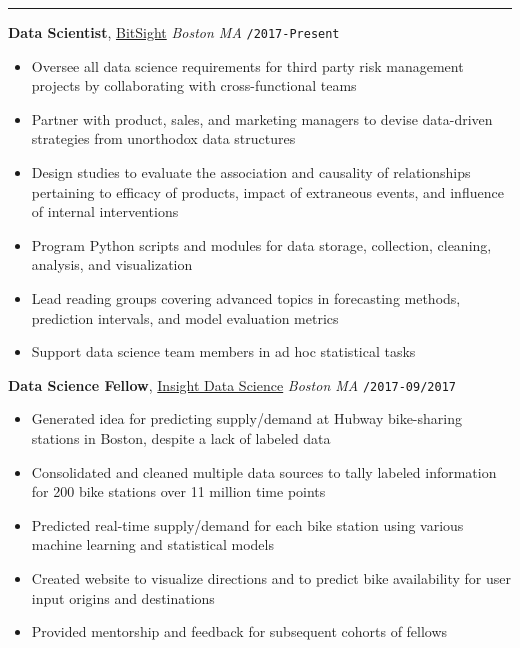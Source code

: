 \documentclass[10pt,english]{report}
\begin{document}
{}
\vspace{1mm}\hrule
\vspace{1mm}

\textbf{Data Scientist}, \textcolor{blue}{\href{https://www.bitsight.com}{BitSight}} \hfill \textit{Boston MA} \texttt{/2017-Present}
\vspace{1mm}
\begin{itemize}
\item Oversee all data science requirements for third party risk management projects by collaborating with cross-functional teams
\item Partner with product, sales, and marketing managers to devise data-driven strategies from unorthodox data structures
\item Design studies to evaluate the association and causality of relationships pertaining to efficacy of products, impact of extraneous events, and influence of internal interventions
\item Program Python scripts and modules for data storage, collection, cleaning, analysis, and visualization
\item Lead reading groups covering advanced topics in forecasting methods, prediction intervals, and model evaluation metrics
\item Support data science team members in ad hoc statistical tasks
\end{itemize}

\vspace{1mm}

\textbf{Data Science Fellow}, \textcolor{blue}{\href{https://www.insightdatascience.com}{Insight Data Science}} \hfill \textit{Boston MA} \texttt{/2017-09/2017}
\begin{itemize}
\item Generated idea for predicting supply/demand at Hubway bike-sharing stations in Boston, despite a lack of labeled data
\item Consolidated and cleaned multiple data sources to tally labeled information for 200 bike stations over 11 million time points
\item Predicted real-time supply/demand for each bike station using various machine learning and statistical models
\item Created website to visualize directions and to predict bike availability for user input origins and destinations
\item Provided mentorship and feedback for subsequent cohorts of fellows
\end{itemize}
\end{document}
